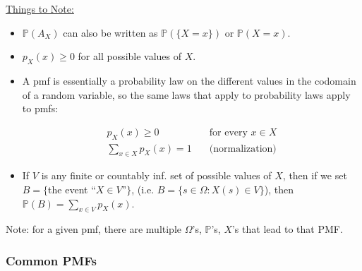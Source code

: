 \documentclass{article}
\begin{document}
\bigskip
\underline{Things to Note:}

\begin{itemize}
\item $\mathbb{P}(A_X)$ can also be written as $\mathbb{P}(\{X = x\})$
  or $\mathbb{P}(X = x)$.

\item $p_X(x) \geq 0$ for all possible values of $X$.

\item A pmf is essentially a probability law on the different values
  in the codomain of a random variable, so the same laws that apply
  to probability laws apply to pmfs:

  \[
    \begin{aligned}
      p_X(x) \ge 0 & \quad \text{for every } x \in X \\
      \sum\limits_{x \in X} p_X(x) = 1 & \quad \text{(normalization)}
    \end{aligned}
  \]

\item If $V$ is any finite or countably inf. set of possible values of
  $X$, then if we set $B = \{ $the event ``$X \in V$''$\}$,
  (i.e. $B = \{ s \in \Omega : X(s) \in V \} $), then
  $\mathbb{P}(B) = \sum\limits_{x \in V} p_X(x)$.
\end{itemize}

Note: for a given pmf, there are multiple $\Omega$'s, $\mathbb{P}$'s,
$X$'s that lead to that PMF.

\subsubsection{Common PMFs}
\end{document}
